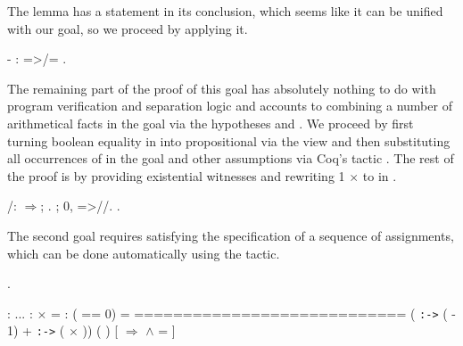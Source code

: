 \coqdocemptyline
The lemma has a statement in its conclusion, which seems like it can
be unified with our goal, so we proceed by applying it.
\begin{coqdoccode}
\coqdocemptyline
\coqdocnoindent
- : =>/= \coqdocvar{\_}.\coqdoceol
\coqdocemptyline
\end{coqdoccode}


The remaining part of the proof of this goal has absolutely nothing to
do with program verification and separation logic and accounts to
combining a number of arithmetical facts in the goal via the
hypotheses  and . We proceed by first turning boolean
equality in  into propositional via the view  and then
substituting all occurrences of  in the goal and other assumptions
via Coq's tactic . The rest of the proof is by providing
existential witnesses and rewriting 1 \ensuremath{\times}  to  in .
\begin{coqdoccode}
\coqdocemptyline
\coqdocindent{1.00em}
/: \ensuremath{\Rightarrow};  .\coqdoceol
\coqdocindent{1.00em}
;    0, =>//.\coqdoceol
\coqdocindent{1.00em}
    .\coqdoceol
\coqdocemptyline
\end{coqdoccode}


The second goal requires satisfying the specification of a sequence of
assignments, which can be done automatically using the  tactic.
\begin{coqdoccode}
\coqdocemptyline
\coqdocnoindent
{}.\coqdoceol
\coqdocemptyline
\end{coqdoccode}


\coqdoceol
\coqdocemptyline
\coqdocindent{1.00em}
 :   \coqdoceol
\coqdocindent{1.00em}
...\coqdoceol
\coqdocindent{1.00em}
 :   \ensuremath{\times}  =  \coqdoceol
\coqdocindent{1.00em}
 : ( == 0) = \coqdoceol
\coqdocindent{1.00em}
============================\coqdoceol
\coqdocindent{1.50em}
 ( \texttt{:->} ( - 1) +  \texttt{:->} ( \ensuremath{\times} )) ( )\coqdoceol
\coqdocindent{2.50em}
[   \ensuremath{\Rightarrow}      \ensuremath{\land}  =  ]

